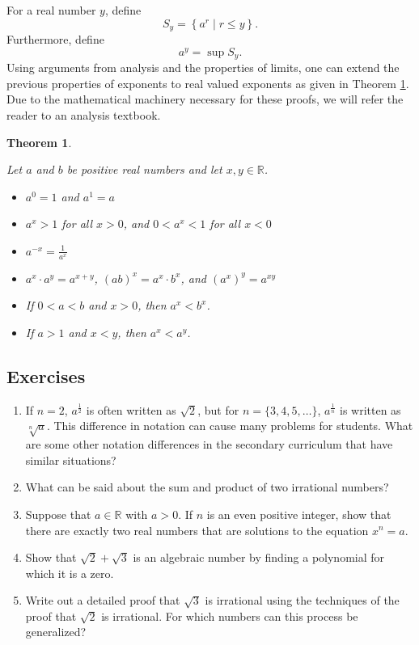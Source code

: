 \documentclass[
]{book}
\newtheorem{theorem}{Theorem}[chapter]
\theoremstyle{definition}
\theoremstyle{definition}
\theoremstyle{definition}
\theoremstyle{definition}
\theoremstyle{remark}
\begin{document}
For a real number \(y\), define \[S_y= \left\{ a^r \middle \vert r \leq y\right\}.\] Furthermore, define \[a^y = \sup S_y.\] Using arguments from analysis and the properties of limits, one can extend the previous properties of exponents to real valued exponents as given in Theorem \ref{thm:exponents-reals}. Due to the mathematical machinery necessary for these proofs, we will refer the reader to an analysis textbook.

\begin{theorem}
\protect\hypertarget{thm:exponents-reals}{}\label{thm:exponents-reals}

Let \(a\) and \(b\) be positive real numbers and let \(x,y\in \mathbb{R}\).

\begin{itemize}
\item
  \(a^0=1\) and \(a^1=a\)
\item
  \(a^x >1\) for all \(x>0\), and \(0<a^x<1\) for all \(x<0\)
\item
  \(a^{-x} = \frac{1}{a^x}\)
\item
  \(a^x\cdot a^y = a^{x+y}\), \((ab)^x=a^x\cdot b^x\), and \((a^x)^y = a^{xy}\)
\item
  If \(0<a<b\) and \(x>0\), then \(a^x<b^x\).
\item
  If \(a>1\) and \(x<y\), then \(a^x<a^y\).
\end{itemize}

\end{theorem}

\hypertarget{exercises-14}{%
\subsection{Exercises}\label{exercises-14}}

\begin{enumerate}
\def\labelenumi{\arabic{enumi}.}
\item
  If \(n=2\), \(a^\frac{1}{2}\) is often written as \(\sqrt{2}\), but for \(n=\{3,4,5, \ldots\}\), \(a^{\frac{1}{n}}\) is written as \(\sqrt[n]{a}\). This difference in notation can cause many problems for students. What are some other notation differences in the secondary curriculum that have similar situations?
\item
  What can be said about the sum and product of two irrational numbers?
\item
  Suppose that \(a\in \mathbb{R}\) with \(a>0\). If \(n\) is an even positive integer, show that there are exactly two real numbers that are solutions to the equation \(x^n=a\).
\item
  Show that \(\sqrt{2}+\sqrt{3}\) is an algebraic number by finding a polynomial for which it is a zero.
\item
  Write out a detailed proof that \(\sqrt{3}\) is irrational using the techniques of the proof that \(\sqrt{2}\) is irrational. For which numbers can this process be generalized?
\end{enumerate}
\end{document}
